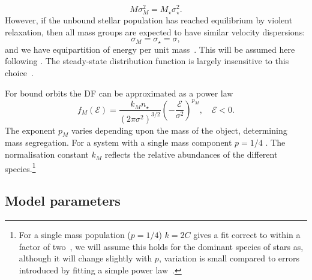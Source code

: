\documentclass[useAMS,usedcolumn,usegraphicx,usenatbib]{mn2e}
\begin{document}
\begin{equation}
M \sigma_M^2 = M_\star \sigma_\star^2.
\end{equation}
However, if the unbound stellar population has reached equilibrium by violent relaxation, then all mass groups are expected to have similar velocity dispersions:
\begin{equation}
\sigma_M = \sigma_\star = \sigma,
\end{equation}
and we have equipartition of energy per unit mass~\citep{Lynden-Bell1967}. This will be assumed here following \citet{Alexander2009, O'Leary2009}. The steady-state distribution function is largely insensitive to this choice~\citep{Bahcall1977, Alexander2009}.

For bound orbits the DF can be approximated as a power law~\citep{Peebles1972}
\begin{equation}
f_M(\mathcal{E}) = \frac{k_M n_\star}{(2\pi\sigma^2)^{3/2}}\left(-\frac{\mathcal{E}}{\sigma^2}\right)^{p_M},\quad\mathcal{E} < 0.
\label{eq:Bound_DF}
\end{equation}
The exponent $p_M$ varies depending upon the mass of the object, determining mass segregation. For a system with a single mass component $p = 1/4$ \citet{Bahcall1976, Young1977}. The normalisation constant $k_M$ reflects the relative abundances of the different species.\footnote{For a single mass population ($p = 1/4$) $k = 2 C$ gives a fit correct to within a factor of two~\citep{Bahcall1976,Keshet2009}, we will assume this holds for the dominant species of stars as, although it will change slightly with $p$, variation is small compared to errors introduced by fitting a simple power law~\citep{Hopman2006, Alexander2009}.}

\subsection{Model parameters}\label{sec:GC-Param}
\end{document}
